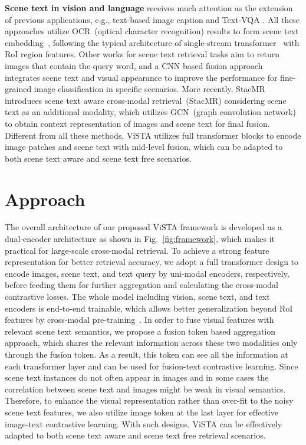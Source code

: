 \documentclass[10pt,twocolumn,letterpaper]{article}
\begin{document}
\noindent \textbf{Scene text in vision and language}
receives much attention as the extension of previous applications, e.g., text-based image caption \cite{sidorov2020textcaps,yang2021tap} and Text-VQA \cite{singh2019towards, biten2019scene,yang2021tap,Beyond_OCR_VQA,simple_is_not_easy}. All these approaches utilize OCR~(optical character recognition) results to form scene text embedding~\cite{singh2019towards, biten2019scene,yang2021tap,single_shot_st}, following the typical architecture of single-stream transformer~\cite{vilbert} with RoI region features. Other works \cite{single_shot_st}\cite{wang2021scene_CVPR21} for scene text retrieval tasks aim to return images that contain the query word, and a CNN based fusion approach~\cite{integrate_scene_text} integrates scene text and visual appearance to improve the performance for fine-grained image classification in specific scenarios. More recently, StacMR \cite{STARNet} introduces scene text aware cross-modal retrieval~(StacMR) considering scene text as an additional modality, which utilizes GCN~(graph convolution network) to obtain context representation of images and scene text for final fusion. Different from all these methods, ViSTA utilizes full transformer blocks to encode image patches and scene text with mid-level fusion, which can be adapted to both scene text aware and scene text free scenarios.


\section{Approach}
The overall architecture of our proposed ViSTA framework is developed as a dual-encoder architecture as shown in Fig.~\ref{fig:framework}, which makes it practical for large-scale cross-modal retrieval. To achieve a strong feature representation for better retrieval accuracy, we adopt a full transformer design to encode images, scene text, and text query by uni-modal encoders, respectively, before feeding them for further aggregation and calculating the cross-modal contrastive losses. The whole model including vision, scene text, and text encoders is end-to-end trainable, which allows better generalization beyond RoI features by cross-modal pre-training~\cite{Pixel-BERT}\cite{SOHO}\cite{ViLT}\cite{xue2021probing}. In order to fuse visual features with relevant scene text semantics, we propose a fusion token based aggregation approach, which shares the relevant information across these two modalities only through the fusion token. As a result, this token can see all the information at each transformer layer and can be used for fusion-text contrastive learning. Since scene text instances do not often appear in images and in some cases the correlation between scene text and images might be weak in visual semantics. Therefore, to enhance the visual representation rather than over-fit to the noisy scene text features, we also utilize image token at the last layer for effective image-text contrastive learning. With such designs, ViSTA can be effectively adapted to both scene text aware and scene text free retrieval scenarios.
 
\end{document}
